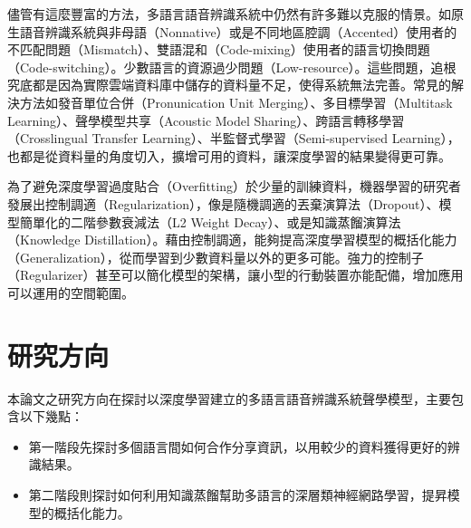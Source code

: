 儘管有這麼豐富的方法，多語言語音辨識系統中仍然有許多難以克服的情景。如原生語音辨識系統與非母語（Nonnative）\cite{van2000speech}或是不同地區腔調（Accented）使用者\cite{kat1999fast}的不匹配問題（Mismatch）、雙語混和（Code-mixing）\cite{yeh2012recognition}使用者的語言切換問題（Code-switching）。少數語言的資源過少問題（Low-resource）\cite{besacier2014automatic}。這些問題，追根究底都是因為實際雲端資料庫中儲存的資料量不足，使得系統無法完善。常見的解決方法如發音單位合併（Pronunication Unit Merging）\cite{vu2012first}\cite{zhang2008mandarin}、多目標學習（Multitask Learning）、聲學模型共享（Acoustic Model Sharing）\cite{vu2014multilingual}、跨語言轉移學習（Crosslingual Transfer Learning）\cite{huang2013cross}、半監督式學習（Semi-supervised Learning）\cite{cucu2011investigating}，也都是從資料量的角度切入，擴增可用的資料，讓深度學習的結果變得更可靠。

為了避免深度學習過度貼合（Overfitting）於少量的訓練資料，機器學習的研究者發展出控制調適（Regularization），像是隨機調適的丟棄演算法（Dropout）\cite{srivastava2014dropout}、模型簡單化的二階參數衰減法（L2 Weight Decay）、或是知識蒸餾演算法（Knowledge Distillation）\cite{hinton2015distilling}\cite{rusu2015policy}。藉由控制調適，能夠提高深度學習模型的概括化能力（Generalization），從而學習到少數資料量以外的更多可能。強力的控制子（Regularizer）甚至可以簡化模型的架構，讓小型的行動裝置亦能配備，增加應用可以運用的空間範圍。

\section{研究方向}
本論文之研究方向在探討以深度學習建立的多語言語音辨識系統聲學模型，主要包含以下幾點：

\begin{itemize}
\itemsep -2pt %
  \item  第一階段先探討多個語言間如何合作分享資訊，以用較少的資料獲得更好的辨識結果。

  \item  第二階段則探討如何利用知識蒸餾幫助多語言的深層類神經網路學習，提昇模型的概括化能力。

\end{itemize}
